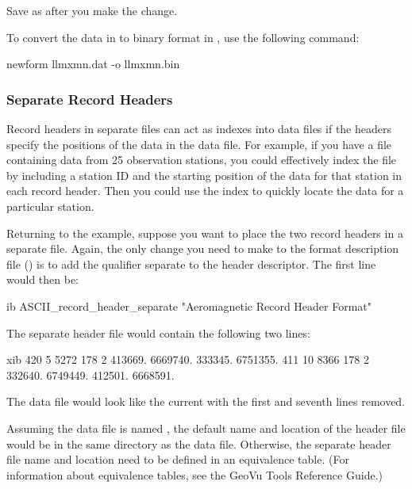 Save  as  after you make the change.

To convert the data in  to binary format in
, use the following command:

\begin{example}
newform llmxmn.dat -o llmxmn.bin 
\end{example}


\subsubsection{Separate Record Headers}

Record headers in separate files can act as indexes into data files if
the headers specify the positions of the data in the data file. For
example, if you have a file containing data from 25 observation
stations, you could effectively index the file by including a station
ID and the starting position of the data for that station in each
record header. Then you could use the index to quickly locate the data
for a particular station.

Returning to the  example, suppose you want to place the
two record headers in a separate file. Again, the only change you need
to make to the format description file () is to add
the qualifier separate to the header descriptor. The first line would
then be:

\begin{vcode}{ib}
ASCII_record_header_separate "Aeromagnetic Record Header Format" 
\end{vcode}

The separate header file would contain the following two lines: 

\begin{vcode}{xib}
420       5     5272     178       2   413669.  6669740.   333345.  6751355.
411      10     8366     178       2   332640.  6749449.   412501.  6668591. 
\end{vcode}

The data file would look like the current  with the
first and seventh lines removed.

Assuming the data file is named , the default name
and location of the header file would be  in the same
directory as the data file. Otherwise, the separate header file name
and location need to be defined in an equivalence table. (For
information about equivalence tables, see the GeoVu Tools Reference
Guide.)

